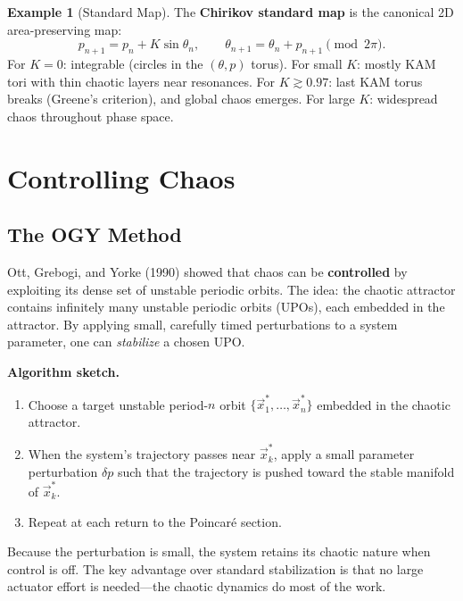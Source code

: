 \documentclass[11pt,letterpaper]{article}
\theoremstyle{definition}
\newtheorem{example}{Example}[section]
\theoremstyle{plain}
\theoremstyle{remark}
\begin{document}
\begin{example}[Standard Map]
The \textbf{Chirikov standard map} is the canonical 2D area-preserving map:
\begin{equation}
  p_{n+1} = p_n + K\sin\theta_n, \qquad
  \theta_{n+1} = \theta_n + p_{n+1} \pmod{2\pi}.
\end{equation}
For $K=0$: integrable (circles in the $(\theta,p)$ torus).
For small $K$: mostly KAM tori with thin chaotic layers near resonances.
For $K \gtrsim 0.97$: last KAM torus breaks (Greene's criterion), and
global chaos emerges.  For large $K$: widespread chaos throughout phase space.
\end{example}

\section{Controlling Chaos}\label{sec:controlling-chaos}

\subsection{The OGY Method}

Ott, Grebogi, and Yorke (1990) showed that chaos can be
\textbf{controlled} by exploiting its dense set of unstable periodic
orbits.  The idea: the chaotic attractor contains infinitely many
unstable periodic orbits (UPOs), each embedded in the attractor.
By applying small, carefully timed perturbations to a system parameter,
one can \emph{stabilize} a chosen UPO.

\textbf{Algorithm sketch.}
\begin{enumerate}[leftmargin=2em]
  \item Choose a target unstable period-$n$ orbit $\{\vec{x}_1^*,\ldots,
    \vec{x}_n^*\}$ embedded in the chaotic attractor.
  \item When the system's trajectory passes near $\vec{x}_k^*$, apply
    a small parameter perturbation $\delta p$ such that the trajectory
    is pushed toward the stable manifold of $\vec{x}_k^*$.
  \item Repeat at each return to the Poincar\'e section.
\end{enumerate}
Because the perturbation is small, the system retains its chaotic
nature when control is off.  The key advantage over standard stabilization
is that no large actuator effort is needed---the chaotic dynamics do most
of the work.
\end{document}
